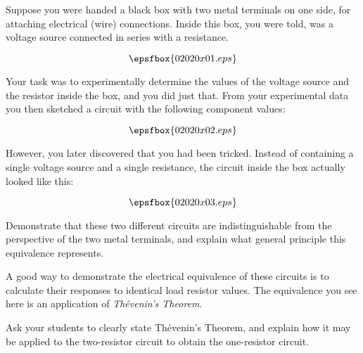 

Suppose you were handed a black box with two metal terminals on one side, for attaching electrical (wire) connections.  Inside this box, you were told, was a voltage source connected in series with a resistance.

$$\epsfbox{02020x01.eps}$$

Your task was to experimentally determine the values of the voltage source and the resistor inside the box, and you did just that.  From your experimental data you then sketched a circuit with the following component values:

$$\epsfbox{02020x02.eps}$$

However, you later discovered that you had been tricked.  Instead of containing a single voltage source and a single resistance, the circuit inside the box actually looked like this:

$$\epsfbox{02020x03.eps}$$

Demonstrate that these two different circuits are indistinguishable from the perspective of the two metal terminals, and explain what general principle this equivalence represents.







A good way to demonstrate the electrical equivalence of these circuits is to calculate their responses to identical load resistor values.  The equivalence you see here is an application of {\it Th\'evenin's Theorem}.







Ask your students to clearly state Th\'evenin's Theorem, and explain how it may be applied to the two-resistor circuit to obtain the one-resistor circuit.




